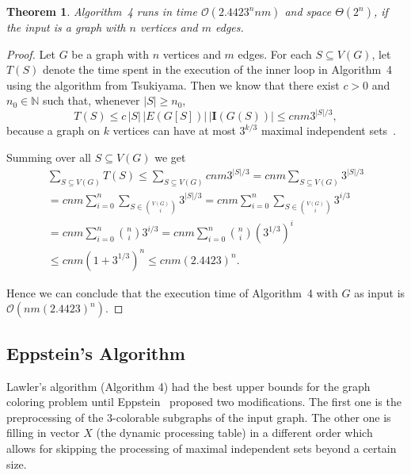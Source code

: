 \documentclass[fleqn,10pt]{SelfArx} %
\newtheorem{teor}{Theorem}
\newcommand{\bI}{\textbf{I}}
\newcommand{\parenteses}[1] {\ensuremath{\left ( {#1} \right )}}
\newcommand{\cO}{\mathcal{O}}
\newcommand{\bN}{\ensuremath{\mathbb{N}}}
\begin{document}
	\begin{teor}\label{teo:lawler} 
		Algorithm~4 runs in time
		$\cO(2.4423^n n m)$ and space $\Theta(2^n)$, if the input is a
		graph with $n$ vertices and $m$ edges.
	\end{teor}
	\begin{proof} 
		Let $G$ be a graph with $n$ vertices and $m$ edges. For
		each $S \subseteq V(G)$, let $T(S)$ denote the time spent in the execution
		of the inner loop in Algorithm~4 using the
		algorithm from Tsukiyama\cite{Tsukiyama77}. Then we know that there
		exist $c > 0$ and $n_{0} \in \bN$ such that, whenever $|S| \geq
		n_{0}$, 
		\begin{equation*}
		T(S) \leq c\, |S|\, |E(G[S])|\, |\bI(G(S))| \leq c n m 3^{|S|/3},
		\end{equation*}
		because a graph on $k$ vertices can have at most $3^{k/3}$ maximal
		independent sets~\cite{MoonMoser65}.
		
		Summing over all $S \subseteq V(G)$ we get
		\begin{multline*}
		\sum_{S \subseteq V(G)} T(S)
		\leq
		\sum_{S \subseteq V(G)} c n m 3^{|S|/3}
		=
		c n m \sum_{S \subseteq V(G)} 3^{|S|/3} \\
		=
		c n m \sum_{i=0}^{n} \sum_{S \in \binom{V(G)}{i}} 3^{|S|/3} 
		=
		c n m \sum_{i=0}^{n} \sum_{S \in \binom{V(G)}{i}} 3^{i/3} \\
		=
		c n m \sum_{i=0}^{n} \binom{n}{i} 3^{i/3} 
		=
		c n m \sum_{i=0}^{n} \binom{n}{i} \parenteses{3^{1/3}}^{i} \\
		\leq
		c n m \parenteses{1+3^{1/3}}^{n}
		\leq 
		c n m \parenteses{2.4423}^{n}.
		\end{multline*}
		
		Hence we can conclude that the execution time of
		Algorithm~4 with $G$ as input is
		$\cO(n m \parenteses{2.4423}^{n})$.
	\end{proof}
	
	\subsection{Eppstein's Algorithm}\label{sec:eppstein}
	
	Lawler's algorithm (Algorithm 4) had the best upper bounds for the graph coloring
	problem until Eppstein~\cite{Eppstein03} proposed two modifications.  The
	first one is the preprocessing of the $3$-colorable subgraphs of the
	input graph. The other one is filling in vector $X$ (the dynamic
	processing table) in a different order which allows for skipping the
	processing of maximal independent sets beyond a certain size.
	
\end{document}

